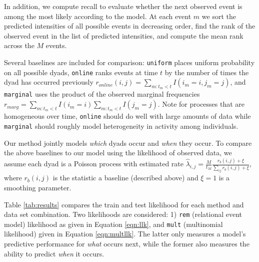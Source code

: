 \documentclass[11pt]{article}
\begin{document}
In addition, we compute recall to evaluate whether the next observed event is among the most likely according to the model.  At each event $m$ we sort the predicted intensities of all possible events in decreasing order, find the rank of the observed event in the list of predicted intensities, and compute the mean rank across the $M$ events.  

Several baselines are included for comparison: \texttt{uniform} places uniform probability on all possible dyads, \texttt{online} ranks events at time $t$ by the number of times the dyad has occurred previously $r_{online}(i,j) = \sum_{m:t_m < t} I(i_m=i,j_m=j)$, and \texttt{marginal} uses the product of the observed marginal frequencies $r_{marg} = \sum_{m:t_m < t} I(i_m=i) \sum_{m:t_m < t} I(j_m=j)$.  Note for processes that are homogeneous over time, \texttt{online} should do well with large amounts of data while \texttt{marginal} should roughly model heterogeneity in activity among individuals.  

Our method jointly models \emph{which} dyads occur and \emph{when} they occur.  To compare the above baselines to our model using the likelihood of observed data, we assume each dyad is a Poisson process with estimated  rate $\hat{\lambda}_{i,j} = \frac{M}{t_M} \frac{r_{b}(i,j) + \xi}{\sum_{ij} r_{b}(i,j) + \xi}$, where $r_b(i,j)$ is the statistic a baseline (described above) and $\xi=1$ is a smoothing parameter.


 Table \ref{tab:results} compares the train and test likelihood for each method and data set combination.  Two likelihoods are considered: 1) \texttt{rem} (relational event model) likelihood as given in Equation \ref{eqn:llk}, and \texttt{mult} (multinomial likelihood) given in Equation \ref{eqn:multllk}.  The latter only measures a model's predictive performance for \emph{what} occurs next, while the former also measures the ability to predict \emph{when} it occurs.  
\end{document}
